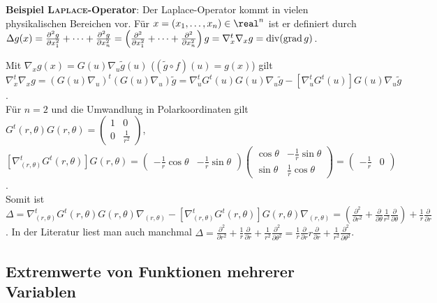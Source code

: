 \linie

\textbf{Beispiel \textsc{Laplace}-Operator}:
Der Laplace-Operator kommt in vielen physikalischen Bereichen vor.
Für $x = (x_1, \dotsc, x_n) \in \real^n$ ist er definiert durch \\
$\Delta g(x) = \frac{\partial^2 g}{\partial x_1^2} + \dotsb +
\frac{\partial^2 g}{\partial x_n^2} =
\left(\frac{\partial^2}{\partial x_1^2} + \dotsb +
\frac{\partial^2}{\partial x_n^2}\right) g = \nabla_x^t \nabla_x g =
\operatorname{div}(\operatorname{grad} g)$.

Mit $\nabla_x g(x) = G(u) \nabla_u \widetilde{g}(u)$
($(\widetilde{g} \circ f)(u) = g(x)$) gilt \\
$\nabla_x^t \nabla_x g = (G(u) \nabla_u)^t (G(u) \nabla_u) \widetilde{g} =
\nabla_u^t G^t(u) G(u) \nabla_u \widetilde{g} -
[\nabla_u^t G^t(u)] G(u) \nabla_u \widetilde{g}$. \\
Für $n = 2$ und die Umwandlung in Polarkoordinaten gilt
$G^t(r, \theta) G(r, \theta) = \begin{pmatrix}1 & 0 \\
0 & \frac{1}{r^2}\end{pmatrix}$, \\
$[\nabla_{(r,\theta)}^t G^t(r, \theta)] G(r, \theta) =
\begin{pmatrix}-\frac{1}{r} \cos \theta &
-\frac{1}{r} \sin \theta\end{pmatrix} \begin{pmatrix}
\cos \theta & -\frac{1}{r} \sin \theta \\
\sin \theta & \frac{1}{r} \cos \theta\end{pmatrix} =
\begin{pmatrix}-\frac{1}{r} & 0\end{pmatrix}$. \\
Somit ist
$\Delta = \nabla_{(r,\theta)}^t G^t(r, \theta) G(r, \theta) \nabla_{(r,\theta)}
- [\nabla_{(r,\theta)}^t G^t(r, \theta)] G(r, \theta) \nabla_{(r,\theta)} =
\left(\frac{\partial^2}{\partial r^2} + \frac{\partial}{\partial \theta}
\frac{1}{r^2} \frac{\partial}{\partial \theta}\right) + \frac{1}{r}
\frac{\partial}{\partial r}$.
In der Literatur liest man auch manchmal
$\Delta = \frac{\partial^2}{\partial r^2} +
\frac{1}{r} \frac{\partial}{\partial r} +
\frac{1}{r^2} \frac{\partial^2}{\partial \theta^2} =
\frac{1}{r} \frac{\partial}{\partial r} r \frac{\partial}{\partial r} +
\frac{1}{r^2} \frac{\partial^2}{\partial \theta^2}$.

\pagebreak

\subsection{%
    Extremwerte von Funktionen mehrerer Variablen%
}

